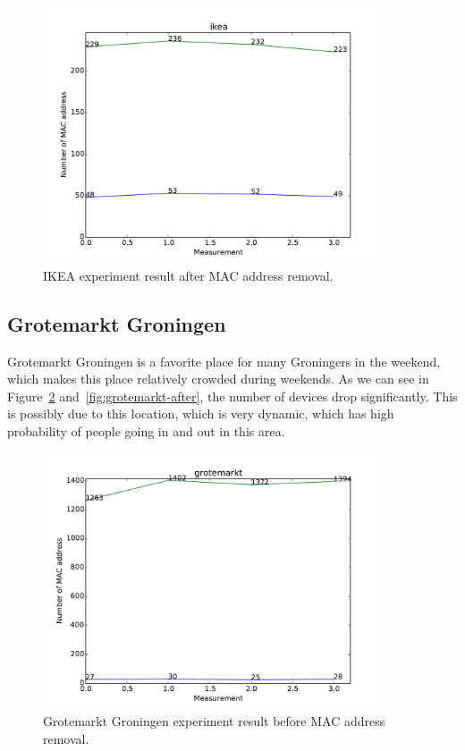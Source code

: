 \documentclass{article}
\begin{document}
\begin{figure}[H]
	\centering
	\includegraphics[width=0.9\textwidth]{./ikea.pdf}
	\caption{IKEA experiment result after MAC address removal. }
	\label{fig:ikea-after}
\end{figure}


\subsection{Grotemarkt Groningen} %
\label{sub:grotemarkt_groningen}
Grotemarkt Groningen is a favorite place for many Groningers in the weekend, which makes this place relatively crowded during weekends. As we can see in Figure~\ref{fig:grotemarkt-before} and~\ref{fig:grotemarkt-after}, the number of devices drop significantly. This is possibly due to this location, which is very dynamic, which has high probability of people going in and out in this area.

\begin{figure}[H]
	\centering
	\includegraphics[width=0.9\textwidth]{./grotemarkt-before.pdf}
	\caption{Grotemarkt Groningen experiment result before MAC address removal.}
	\label{fig:grotemarkt-before}
\end{figure}
\end{document}
